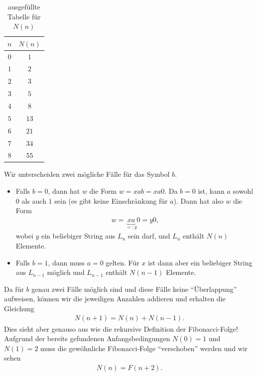 \begin{myanswer}[myexercise:0402]
	\begin{table}[H]
		\begin{center}
			\begin{tabular}{c|c}
				$n$ & $N(n)$ \\ \hline
				$0$ & $1$    \\
				$1$ & $2$    \\
				$2$ & $3$    \\
				$3$ & $5$    \\
				$4$ & $8$    \\
				$5$ & $13$   \\
				$6$ & $21$   \\
				$7$ & $34$   \\
				$8$ & $55$   \\
			\end{tabular}
		\end{center}
		\caption{ausgefüllte Tabelle für $N(n)$}
		\label{table:Nncompleted}
	\end{table}
\end{myanswer}


\begin{myanswer}[myexercise:0403]
	Wir unterscheiden zwei mögliche Fälle für das Symbol $b$.
	\begin{itemize}
		\item Falls $b = 0$, dann hat $w$ die Form $w = xab = xa0$. Da $b = 0$ ist, kann $a$ sowohl $0$ als auch $1$ sein (es gibt keine Einschränkung für $a$). Dann hat also $w$ die Form
		      \begin{align*}
			      w = \underbrace{xa}_{=:y}0 = y0,
		      \end{align*}
		      wobei $y$ ein beliebiger String aus $L_n$ sein darf, und $L_n$ enthält $N(n)$ Elemente.
		\item  Falls $b = 1$, dann muss $a = 0$ gelten. Für $x$ ist dann aber ein beliebiger String aus $L_{n-1}$ möglich und $L_{n-1}$ enthält $N(n-1)$ Elemente.
	\end{itemize}
	Da für $b$ genau zwei Fälle möglich sind und diese Fälle keine \enquote{Überlappung} aufweisen, können wir die jeweiligen Anzahlen addieren und erhalten die Gleichung
	\begin{align}\label{eq:rekkurenz}
		N(n+1) = N(n) + N(n-1).
	\end{align}
	Dies sieht aber genauso aus wie die rekursive Definition der Fibonacci-Folge! Aufgrund der bereits gefundenen Anfangsbedingungen $N(0) = 1$ und $N(1) = 2$ muss die gewöhnliche Fibonacci-Folge \enquote{verschoben} werden und wir sehen
	\begin{align*}
		N(n) = F(n+2).
	\end{align*}
\end{myanswer}


